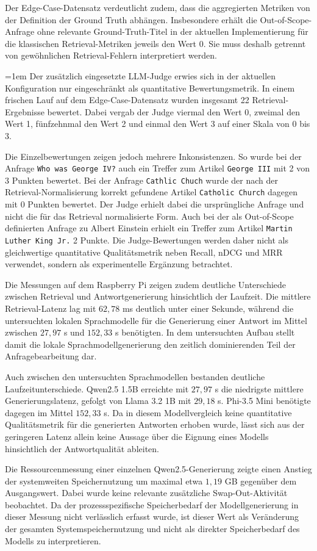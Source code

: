 Der Edge-Case-Datensatz verdeutlicht zudem, dass die aggregierten Metriken
von der Definition der Ground Truth abhängen. Insbesondere erhält die
Out-of-Scope-Anfrage ohne relevante Ground-Truth-Titel in der aktuellen
Implementierung für die klassischen Retrieval-Metriken jeweils den Wert
0. Sie muss deshalb getrennt von gewöhnlichen Retrieval-Fehlern
interpretiert werden.

\begingroup
\emergencystretch=1em
Der zusätzlich eingesetzte LLM-Judge erwies sich in der aktuellen
Konfiguration nur eingeschränkt als quantitative Bewertungsmetrik. In einem
frischen Lauf auf dem Edge-Case-Datensatz wurden insgesamt 22
Retrieval-Ergebnisse bewertet. Dabei vergab der Judge viermal den Wert 0, zweimal den
Wert 1, fünfzehnmal den Wert 2 und einmal den Wert 3 auf einer Skala von 0
bis 3.\par
\endgroup

Die Einzelbewertungen zeigen jedoch mehrere Inkonsistenzen. So wurde bei der
Anfrage \texttt{Who was George IV?} auch ein Treffer zum Artikel
\texttt{George III} mit 2 von 3 Punkten bewertet. Bei der Anfrage \texttt{Cathlic Chuch} wurde der nach der
Retrieval-Normalisierung korrekt gefundene Artikel \texttt{Catholic Church}
dagegen mit 0 Punkten bewertet. Der Judge erhielt dabei die ursprüngliche
Anfrage und nicht die für das Retrieval normalisierte Form. Auch bei der als
Out-of-Scope definierten Anfrage zu Albert Einstein erhielt ein Treffer zum
Artikel \texttt{Martin Luther King Jr.\allowbreak{}} 2 Punkte. Die Judge-Bewertungen werden
daher nicht als gleichwertige quantitative Qualitätsmetrik neben Recall,
nDCG und MRR verwendet, sondern als experimentelle Ergänzung betrachtet.

Die Messungen auf dem Raspberry Pi zeigen zudem deutliche Unterschiede
zwischen Retrieval und Antwortgenerierung hinsichtlich der Laufzeit. Die
mittlere Retrieval-Latenz lag mit $62{,}78$ ms deutlich unter einer Sekunde,
während die untersuchten lokalen Sprachmodelle für die Generierung einer
Antwort im Mittel zwischen $27{,}97$ s und $152{,}33$ s benötigten. In dem
untersuchten Aufbau stellt damit die lokale Sprachmodellgenerierung den
zeitlich dominierenden Teil der Anfragebearbeitung dar.

Auch zwischen den untersuchten Sprachmodellen bestanden deutliche
Laufzeitunterschiede. Qwen2.5 1.5B erreichte mit $27{,}97$ s die niedrigste
mittlere Generierungslatenz, gefolgt von Llama 3.2 1B mit $29{,}18$ s.
Phi-3.5 Mini benötigte dagegen im Mittel $152{,}33$ s. Da in diesem
Modellvergleich keine quantitative Qualitätsmetrik für die generierten
Antworten erhoben wurde, lässt sich aus der geringeren Latenz allein keine
Aussage über die Eignung eines Modells hinsichtlich der Antwortqualität
ableiten.

Die Ressourcenmessung einer einzelnen Qwen2.5-Generierung zeigte einen
Anstieg der systemweiten Speichernutzung um maximal etwa $1{,}19$ GB
gegenüber dem Ausgangswert. Dabei wurde keine relevante zusätzliche
Swap-Out-Aktivität beobachtet. Da der prozessspezifische Speicherbedarf
der Modellgenerierung in dieser Messung nicht verlässlich erfasst wurde,
ist dieser Wert als Veränderung der gesamten Systemspeichernutzung und
nicht als direkter Speicherbedarf des Modells zu interpretieren.